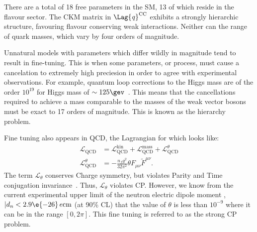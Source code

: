 There are a total of 18 free parameters in the SM, 13 of which reside in the flavour sector.
The CKM matrix in $\Lag{\it q}^\mathrm{CC}$ exhibits a strongly hierarchic structure, favouring
flavour conserving weak interactions.
Neither can the range of quark masses, which vary by four orders of magnitude.

Unnatural models with parameters which differ wildly in magnitude tend to result in fine-tuning.
This is when some parameters, or process, must cause a cancelation to extremely high preciesion in
order to agree with experimental observations.
For example, quantum loop corrections to the Higgs mass are of the order $10^{19}$ for Higgs mass
of $\sim125\gev$~\cite{Chatrchyan:2012ufa,Aad:2012tfa}.
This means that the cancellations required to achieve a mass comparable to the masses of the weak
vector bosons must be exact to 17 orders of magnitude.
This is known as the hierarchy problem.

Fine tuning also appears in QCD, the Lagrangian for which looks like:
\begin{align}
  \mathcal{L}_\mathrm{QCD} &=
  \mathcal{L}_\mathrm{QCD}^\mathrm{kin} +
  \mathcal{L}_\mathrm{QCD}^\mathrm{mass} +
  \mathcal{L}_\mathrm{QCD}^\theta \\
  \mathcal{L}_\mathrm{QCD}^\theta &=
  -\frac{n_fg^2}{32\pi^2}\theta F_{\mu\nu}\widetilde F^{\mu\nu}.
\end{align}
The term $\mathcal{L}_\theta$ conserves Charge symmetry, but violates Parity and Time conjugation
invariance~\cite{Peccei:2006as}.
Thus, $\mathcal{L}_\theta$ violates CP.
However, we know from the current experimental upper limit of the neutron electric dipole moment
\cite{Baker:2006ts},
$|d_n <2.9\e{-26}\,e\mathrm{cm}$ (at 90\% CL) that the value of $\theta$ is less than $10^{-9}$
where it can be in the range $[0,2\pi]$.
This fine tuning is referred to as the strong CP problem.



